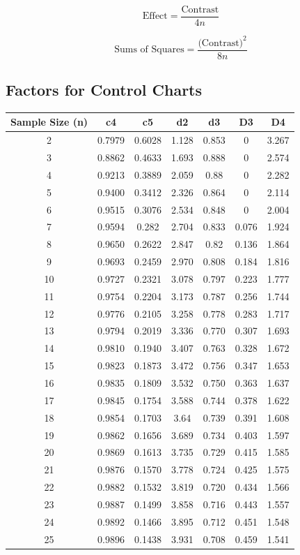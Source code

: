 \documentclass[a4paper,12pt]{article}
\begin{document}
\[\mbox{Effect} =  \frac{\mbox{Contrast}}{4n}\]

\[\mbox{Sums of Squares} =  \frac{\mbox{(Contrast)}^2}{8n}\]

\Large{
	\subsection*{Factors for Control Charts}
	\begin{tabular}{|c|c|c|c|c|c|c|}
		\hline
		Sample Size (n) 	&	c4 	&	c5 	&	d2 	&	d3 	&	D3 	&	D4	\\	\hline
		2	&	0.7979	&	0.6028	&	1.128	&	0.853	&	0	&	3.267	\\	
		3	&	0.8862	&	0.4633	&	1.693	&	0.888	&	0	&	2.574	\\	
		4	&	0.9213	&	0.3889	&	2.059	&	0.88	&	0	&	2.282	\\	
		5	&	0.9400	&	0.3412	&	2.326	&	0.864	&	0	&	2.114	\\	
		6	&	0.9515	&	0.3076	&	2.534	&	0.848	&	0	&	2.004	\\	
		7	&	0.9594	&	0.282	&	2.704	&	0.833	&	0.076	&	1.924	\\	
		8	&	0.9650	&	0.2622	&	2.847	&	0.82	&	0.136	&	1.864	\\	
		9	&	0.9693	&	0.2459	&	2.970	&	0.808	&	0.184	&	1.816	\\	
		10	&	0.9727	&	0.2321	&	3.078	&	0.797	&	0.223	&	1.777	\\	
		11	&	0.9754	&	0.2204	&	3.173	&	0.787	&	0.256	&	1.744	\\	
		12	&	0.9776	&	0.2105	&	3.258	&	0.778	&	0.283	&	1.717	\\	
		13	&	0.9794	&	0.2019	&	3.336	&	0.770	&	0.307	&	1.693	\\	
		14	&	0.9810	&	0.1940	&	3.407	&	0.763	&	0.328	&	1.672	\\	
		15	&	0.9823	&	0.1873	&	3.472	&	0.756	&	0.347	&	1.653	\\	
		16	&	0.9835	&	0.1809	&	3.532	&	0.750	&	0.363	&	1.637	\\
		17	&	0.9845	&	0.1754	&	3.588	&	0.744	&	0.378	&	1.622	\\
		18	&	0.9854	&	0.1703	&	3.64	&	0.739	&	0.391	&	1.608	\\
		19	&	0.9862	&	0.1656	&	3.689	&	0.734	&	0.403	&	1.597	\\
		20	&	0.9869	&	0.1613	&	3.735	&	0.729	&	0.415	&	1.585	\\
		21	&	0.9876	&	0.1570	&	3.778	&	0.724	&	0.425	&	1.575	\\
		22	&	0.9882	&	0.1532	&	3.819	&	0.720	&	0.434	&	1.566	\\
		23	&	0.9887	&	0.1499	&	3.858	&	0.716	&	0.443	&	1.557	\\
		24	&	0.9892	&	0.1466	&	3.895	&	0.712	&	0.451	&	1.548	\\
		25	&	0.9896	&	0.1438	&	3.931	&	0.708	&	0.459	&	1.541	\\
		\hline
	\end{tabular}
} %
\end{document}
